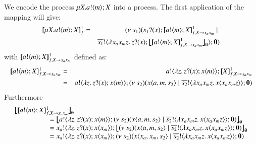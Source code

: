 %

\begin{example}

\noi We encode the \HOp process $\mu X. a ! \langle m \rangle ; X$
into a \HO process. The first application of the mapping
will give:
%
\begin{eqnarray*}
	\pmapp{\recp{X}{\bout{a}{m} \varp{X}}}{1}{f} &=&
	\newsp{s_1}{ \binp{s_1}{x} \pmapp{\bout{a}{m} \varp{X}}{1}{f, \varp{X} \rightarrow x_ax_m} \Par\\
	&&\bout{\dual{s_1}}{ \abs{x_a x_m z} \binp{z}{x} \auxmap{\pmapp{\bout{a}{m} \varp{X}}{1}{f, \varp{X} \rightarrow x_ax_m}}{\es} } \inact}
\end{eqnarray*}
%
\noi with $[\!\![a ! \langle m \rangle ; X]\!\!]^{1}_{f, X \rightarrow x_ax_m}$ defined as:
%
\begin{eqnarray*}
	\pmapp{\bout{a}{m} \varp{X}}{1}{f, \varp{X} \rightarrow x_ax_m} &=&
	\bout{a}{\abs{z}{\binp{z}{x} \appl{x}{m}}} \pmapp{\varp{X}}{1}{f, \varp{X} \rightarrow x_ax_m}
	\\
	&=& \bout{a}{\abs{z}{\binp{z}{x} \appl{x}{m}}} \newsp{s_2}{\appl{x}{a,m, s_2}  \Par \bout{\dual{s_2}}{\abs{x_a x_m z}{\appl{x}{x_a x_m z}}} \inact}
\end{eqnarray*}
%
\noi Furthermore
%
\[
\begin{array}{l}
	\auxmap{\pmapp{\bout{a}{m} \varp{X}}{1}{f, \varp{X} \rightarrow x_ax_m}}{\es}\\
	\qquad \qquad \quad = \auxmap{\bout{a}{\abs{z}{\binp{z}{x} \appl{x}{m}}} \newsp{s_2}{\appl{x}{a,m, s_2}  \Par \bout{\dual{s_2}}{\abs{x_a x_m z}{\appl{x}{x_a x_m z}}} \inact}}{\es}
	\\
	\qquad \qquad \quad = \bout{x_a}{\abs{z}{\binp{z}{x} \appl{x}{x_m}}} \auxmap{\newsp{s_2}{\appl{x}{a,m, s_2}  \Par \bout{\dual{s_2}}{\abs{x_a x_m z}{\appl{x}{x_a x_m z}}} \inact}}{\es}
	\\
	\qquad \qquad \quad = \bout{x_a}{\abs{z}{\binp{z}{x} \appl{x}{x_m}}} \newsp{s_2}{\appl{x}{x_a,x_m, s_2}  \Par \bout{\dual{s_2}}{\abs{x_a x_m z}{\appl{x}{x_a x_m z}}} \inact}

\end{array}\]
\end{example}
